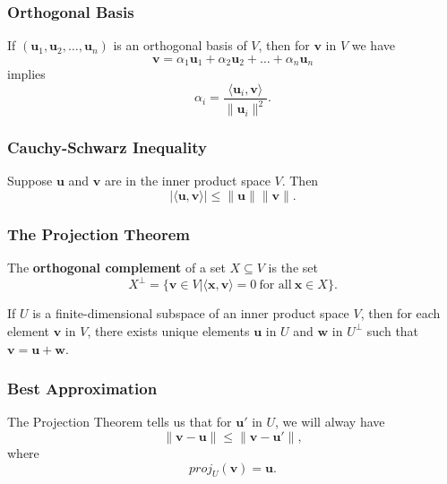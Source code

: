 \documentclass{beamer}
\begin{document}
\begin{frame}
\frametitle{Orthogonal Basis}
If $({\boldsymbol u_1}, {\boldsymbol u_2},\ldots, {\boldsymbol u_n})$ is an orthogonal basis of $V$, then for ${\boldsymbol v}$ in $V$ we have
$$
{\boldsymbol v} = \alpha_1 {\boldsymbol u_1} + \alpha_2 {\boldsymbol u_2} +\ldots + \alpha_n {\boldsymbol u_n}
$$ 
implies
$$
\alpha_i = \frac{\langle {\boldsymbol u_i}, {\boldsymbol v} \rangle}{\|{\boldsymbol u_i}\|^2}.
$$
\end{frame}

\begin{frame}
\frametitle{Cauchy-Schwarz Inequality}
\begin{Theorem}
Suppose ${\boldsymbol u}$ and ${\boldsymbol v}$ are in the inner product space $V$. Then
$$
|\langle {\boldsymbol u}, {\boldsymbol v}\rangle| \leq \|{\boldsymbol u}\| \|{\boldsymbol v}\|.
$$
\end{Theorem}
\end{frame}

\begin{frame}
\frametitle{The Projection Theorem}
\begin{Definition}
The {\bf orthogonal complement} of a set $X\subseteq V$ is the set
$$
X^\perp = \{{\boldsymbol v} \in V| \langle {\boldsymbol x}, {\boldsymbol v}\rangle = 0\ \text{for all}\ {\boldsymbol x}\in X\}.
$$
\end{Definition}

\begin{Theorem}
If $U$ is a finite-dimensional subspace of an inner product space $V$, then for each element ${\boldsymbol v}$ in $V$, there exists unique elements ${\boldsymbol u}$ in $U$ and ${\boldsymbol w}$ in $U^\perp$ such that ${\boldsymbol v} = {\boldsymbol u} + {\boldsymbol w}$.
\end{Theorem}
\end{frame}


\begin{frame}
\frametitle{Best Approximation}
The Projection Theorem tells us that for ${\boldsymbol u'}$ in $U$, we will alway have
$$
\| {\boldsymbol v} - {\boldsymbol u}\| \leq \| {\boldsymbol v} - {\boldsymbol u'}\|,
$$
where
$$
proj_U({\boldsymbol v})= {\boldsymbol u }.
$$

\end{frame}
\end{document}
